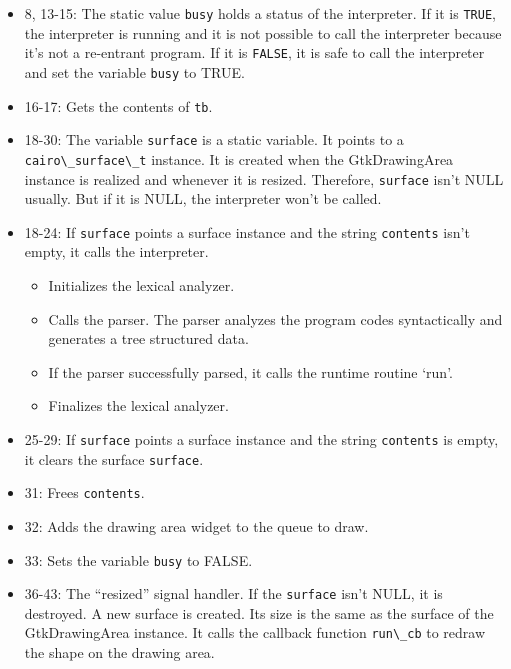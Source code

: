 \begin{itemize}
\tightlist
\item
  8, 13-15: The static value \passthrough{\lstinline!busy!} holds a
  status of the interpreter. If it is \passthrough{\lstinline!TRUE!},
  the interpreter is running and it is not possible to call the
  interpreter because it's not a re-entrant program. If it is
  \passthrough{\lstinline!FALSE!}, it is safe to call the interpreter
  and set the variable \passthrough{\lstinline!busy!} to TRUE.
\item
  16-17: Gets the contents of \passthrough{\lstinline!tb!}.
\item
  18-30: The variable \passthrough{\lstinline!surface!} is a static
  variable. It points to a \passthrough{\lstinline!cairo\_surface\_t!}
  instance. It is created when the GtkDrawingArea instance is realized
  and whenever it is resized. Therefore,
  \passthrough{\lstinline!surface!} isn't NULL usually. But if it is
  NULL, the interpreter won't be called.
\item
  18-24: If \passthrough{\lstinline!surface!} points a surface instance
  and the string \passthrough{\lstinline!contents!} isn't empty, it
  calls the interpreter.

  \begin{itemize}
  \tightlist
  \item
    Initializes the lexical analyzer.
  \item
    Calls the parser. The parser analyzes the program codes
    syntactically and generates a tree structured data.
  \item
    If the parser successfully parsed, it calls the runtime routine
    `run'.
  \item
    Finalizes the lexical analyzer.
  \end{itemize}
\item
  25-29: If \passthrough{\lstinline!surface!} points a surface instance
  and the string \passthrough{\lstinline!contents!} is empty, it clears
  the surface \passthrough{\lstinline!surface!}.
\item
  31: Frees \passthrough{\lstinline!contents!}.
\item
  32: Adds the drawing area widget to the queue to draw.
\item
  33: Sets the variable \passthrough{\lstinline!busy!} to FALSE.
\item
  36-43: The ``resized'' signal handler. If the
  \passthrough{\lstinline!surface!} isn't NULL, it is destroyed. A new
  surface is created. Its size is the same as the surface of the
  GtkDrawingArea instance. It calls the callback function
  \passthrough{\lstinline!run\_cb!} to redraw the shape on the drawing
  area.
\end{itemize}

